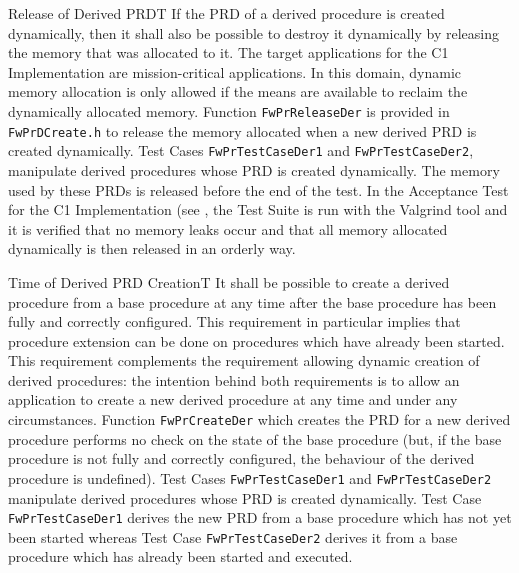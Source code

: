 \documentclass[requirements]{../fwprofile}
\begin{document}
\begin{fw_req}{Release of Derived PRD}{T}
{If the PRD of a derived procedure is created dynamically, then it shall also be possible to destroy it dynamically by releasing the memory that was allocated to it.}
{The target applications for the C1 Implementation are mission-critical applications. In this domain, dynamic memory allocation is only allowed if the means are available to reclaim the dynamically allocated memory.}
{Function \texttt{FwPrReleaseDer} is provided in \texttt{FwPrDCreate.h} to release the memory allocated when a new derived PRD is created dynamically.} 
{Test Cases \texttt{FwPrTestCaseDer1} and \texttt{FwPrTestCaseDer2},
manipulate derived procedures whose PRD is created dynamically. 
The memory used by these PRDs is released before the end of the test. 
In the Acceptance Test for the C1 Implementation (see \cite{ref:um}, the Test Suite is run 
with the Valgrind tool and it is verified that no memory leaks occur and 
that all memory allocated dynamically is then released in an orderly way.}
\end{fw_req}


\begin{fw_req_note}{Time of Derived PRD Creation}{T}
{It shall be possible to create a derived procedure from a base procedure at any time after the base procedure has been fully and correctly configured.}
{This requirement in particular implies that procedure extension can be done on procedures which have already been started.}
{This requirement complements the requirement allowing dynamic creation of derived procedures: the intention behind 
both requirements is to allow an application to create a new derived procedure at any time and under any circumstances.}
{Function \texttt{FwPrCreateDer} which creates the PRD for a new derived procedure performs no check on the state of the 
base procedure (but, if the base procedure is not fully and correctly configured, the behaviour of the derived procedure is undefined).} 
{Test Cases \texttt{FwPrTestCaseDer1} and \texttt{FwPrTestCaseDer2}
manipulate derived procedures whose PRD is created dynamically. 
Test Case \texttt{FwPrTestCaseDer1} derives the new PRD from a base procedure which has not yet been started 
whereas Test Case \texttt{FwPrTestCaseDer2} 
derives it from a base procedure which has already been started and executed.}
\end{fw_req_note}
\end{document}
